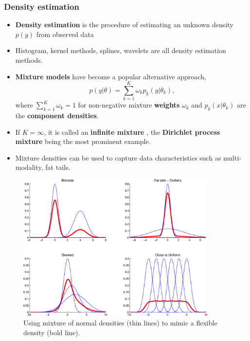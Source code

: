 \documentclass[11pt]{beamer}
\begin{document}
\begin{frame}
  \frametitle{Density estimation}
  \begin{itemize}
  \item \textbf{Density estimation} is the procedure of estimating an unknown density
    $p(y)$ from observed data

  \item Histogram, kernel methods, splines, wavelets are all density estimation
    methods.

  \item \textbf{Mixture models} \citep{jiang1999approximation} have become a popular alternative approach,
    \[
    p(y|\theta)=\sum\limits _{k=1}^{K}\omega_{k}p_{k}(y|\theta_{k}),
    \]
    where $\sum\nolimits _{k=1}^{K}\omega_{k}=1$ for non-negative mixture
    \textbf{weights} $\omega_{k}$ and $p_{k}(x|\theta_{k})$ are the \textbf{
      component densities}.

  \item If $K=\infty$, it is called an \textbf{infinite mixture} \citep{escobar1994estimating}, the
    \textbf{Dirichlet process mixture} being the most prominent example.

  \item Mixture densities can be used to capture data characteristics such as
    multi-modality, fat tails.

  \end{itemize}

\end{frame}


\begin{frame}
  \begin{figure}
    \centering
    \includegraphics[width=10cm]{MixtureOfNormals2}\caption{Using mixture of normal
      densities (thin lines) to mimic a flexible density (bold line).}
    \label{fig: mix-norm}
  \end{figure}
\end{frame}
\end{document}
